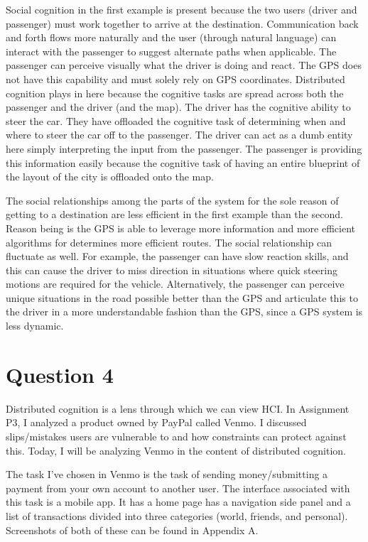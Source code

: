 Social cognition in the first example is present because the two users (driver and passenger) must work together to arrive at the destination. Communication back and forth flows more naturally and the user (through natural language) can interact with the passenger to suggest alternate paths when applicable. The passenger can perceive visually what the driver is doing and react. The GPS does not have this capability and must solely rely on GPS coordinates. Distributed cognition plays in here because the cognitive tasks are spread across both the passenger and the driver (and the map). The driver has the cognitive ability to steer the car. They have offloaded the cognitive task of determining when and where to steer the car off to the passenger. The driver can act as a dumb entity here simply interpreting the input from the passenger. The passenger is providing this information easily because the cognitive task of having an entire blueprint of the layout of the city is offloaded onto the map.

The social relationships among the parts of the system for the sole reason of getting to a destination are less efficient in the first example than the second. Reason being is the GPS is able to leverage more information and more efficient algorithms for determines more efficient routes. The social relationship can fluctuate as well. For example, the passenger can have slow reaction skills, and this can cause the driver to miss direction in situations where quick steering motions are required for the vehicle. Alternatively, the passenger can perceive unique situations in the road possible better than the GPS and articulate this to the driver in a more understandable fashion than the GPS, since a GPS system is less dynamic.

\section{Question 4}

Distributed cognition is a lens through which we can view HCI. In Assignment P3, I analyzed a product owned by PayPal called Venmo. I discussed slips/mistakes users are vulnerable to and how constraints can protect against this. Today, I will be analyzing Venmo in the content of distributed cognition.

The task I've chosen in Venmo is the task of sending money/submitting a payment from your own account to another user. The interface associated with this task is a mobile app. It has a home page has a navigation side panel and a list of transactions divided into three categories (world, friends, and personal). Screenshots of both of these can be found in Appendix A.

